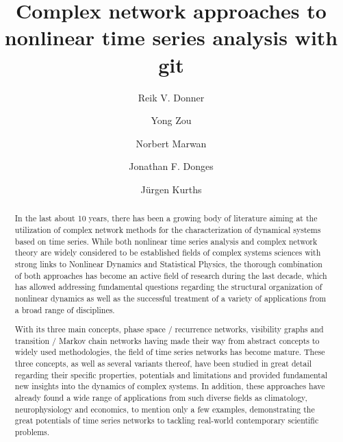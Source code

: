 \documentclass[3p,sort&compress]{elsarticle}
\begin{document}
\begin{frontmatter}

\title{Complex network approaches to nonlinear time series analysis with git}

\author[PIK]{Reik V. Donner}
\address[PIK]{Potsdam Institute for Climate Impact Research, P.\,O.~Box
60\,12\,03, 14412 Potsdam, Germany}

\author[ECNU]{Yong Zou}
\address[ECNU]{Department of Physics, East China Normal University, Shanghai 200062, China}

\author[PIK]{Norbert Marwan}

\author[PIK]{Jonathan F. Donges}

\author[PIK,UK,HU,RU1,RU2]{J\"urgen Kurths}
 \address[UK]{Institute for Complex Systems and Mathematical Biology, University
 of Aberdeen, Aberdeen AB243UE, United Kingdom}
 \address[HU]{Department of Physics, Humboldt University Berlin,
 Newtonstra{\ss}e 15, 12489 Berlin, Germany}
\address[RU1]{Department of Control Theory, Nizhny Novgorod State University,
Gagarin Avenue 23, 606950 Nizhny Novgorod, Russia} 
\address[RU2]{Institute of Applied Physics of the Russian Academy of Sciences,
603950 Nizhny Novgorod, Russia}


\begin{abstract}

In the last about 10 years, there has been a growing body of literature aiming
at the utilization of complex network methods for the characterization of
dynamical systems based on time series. While both nonlinear time series
analysis and complex network theory are widely considered to be established
fields of complex systems sciences with strong links to Nonlinear Dynamics and
Statistical Physics, the thorough combination of both approaches has become an
active field of research during the last decade, which has allowed addressing
fundamental questions regarding the structural organization of nonlinear
dynamics as well as the successful treatment of a variety of applications from a
broad range of disciplines.

With its three main concepts, phase space / recurrence networks, visibility
graphs and transition / Markov chain networks having made their way from
abstract concepts to widely used methodologies, the field of time series
networks has become mature. These three concepts, as well as several variants
thereof, have been studied in great detail regarding their specific properties,
potentials and limitations and provided fundamental new insights into the
dynamics of complex systems. In addition, these approaches have already found a
wide range of applications from such diverse fields as climatology,
neurophysiology and economics, to mention only a few examples, demonstrating the
great potentials of time series networks to tackling real-world contemporary
scientific problems.


\end{abstract}
\end{frontmatter}
\end{document}
